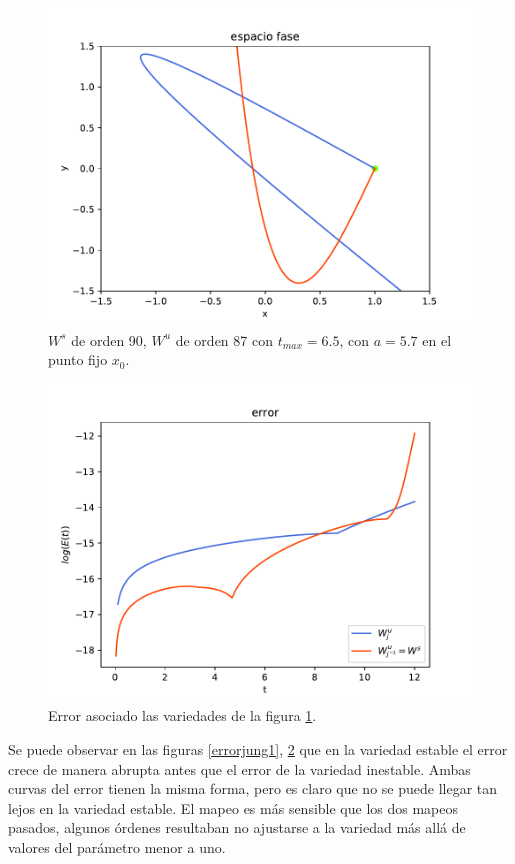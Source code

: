 \begin{figure}[H]
\centering
\includegraphics[scale=0.6]{jung57}
\caption{$W^{s}$ de orden 90, $W^{u}$ de orden 87 con $t_{max}=6.5$, con $a=5.7$ en el punto fijo $x_{0}$.}
\label{jung2}
\end{figure}


\begin{figure}[H]
\centering
\includegraphics[scale=0.6]{error_jung57}
\caption{Error asociado las variedades de la figura \ref{jung2}.}
\label{errorjung2}
\end{figure}
Se puede observar en las figuras \ref{errorjung1}, \ref{errorjung2} que en la variedad estable el error crece de manera abrupta antes que el error de la variedad inestable. Ambas curvas del error tienen la misma forma, pero es claro que no se puede llegar tan lejos en la variedad estable. El mapeo es más sensible que los dos mapeos pasados, algunos órdenes resultaban no ajustarse a la variedad más allá de valores del parámetro menor a uno. 


